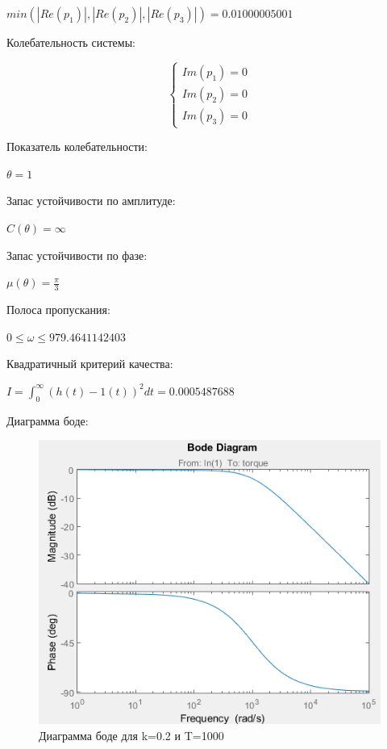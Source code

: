 \documentclass[14pt,a4paper,report]{report}
\begin{document}
\begin{center}
$min(|Re(p_1)|, |Re(p_2)|, |Re(p_3)|) = 0.01000005001$
\end{center}

Колебательность системы:

\begin{equation*}
\begin{cases}
	\text{$Im(p_1)=0$} \\
	\text{$Im(p_2)=0$} \\
	\text{$Im(p_3)=0$}
\end{cases}
\end{equation*}

Показатель колебательности:

\begin{center}
$\theta=1$
\end{center}

Запас устойчивости по амплитуде:

\begin{center}
$C(\theta)=\infty$
\end{center}

Запас устойчивости по фазе:

\begin{center}
$\mu(\theta)=\frac{\pi}{3}$
\end{center}

Полоса пропускания:

\begin{center}
$0\leq\omega\leq979.4641142403$
\end{center}

Квадратичный критерий качества:

\begin{center}
$I=\int_{0}^{\infty}(h(t)-1(t))^2dt=0.0005487688$
\end{center}

Диаграмма боде:

\begin{figure}[h!]
	\centering
	\includegraphics[scale = 0.56]{images/bode1000.png}
	\caption{Диаграмма боде для k=0.2 и T=1000}
	\label{image:6}
\end{figure}
\end{document}
